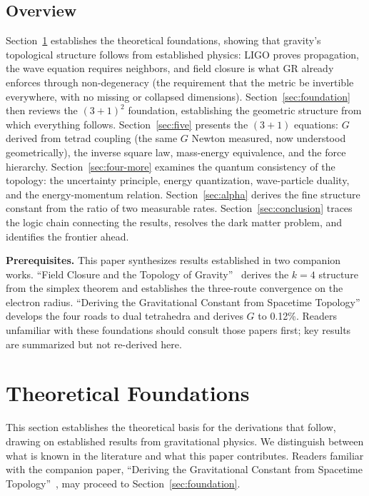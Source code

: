 \documentclass[aps,prd,preprint,superscriptaddress,showpacs,preprintnumbers,amsmath,amssymb,nofootinbib]{revtex4-2}
\begin{document}
\subsection{Overview}
\label{subsec:structure}

Section~\ref{sec:theory} establishes the theoretical foundations, showing that gravity's topological structure follows from established physics: LIGO proves propagation, the wave equation requires neighbors, and field closure is what GR already enforces through non-degeneracy (the requirement that the metric be invertible everywhere, with no missing or collapsed dimensions). Section~\ref{sec:foundation} then reviews the $(3+1)^2$ foundation, establishing the geometric structure from which everything follows. Section~\ref{sec:five} presents the $(3+1)$ equations: $G$ derived from tetrad coupling (the same $G$ Newton measured, now understood geometrically), the inverse square law, mass-energy equivalence, and the force hierarchy. Section~\ref{sec:four-more} examines the quantum consistency of the topology: the uncertainty principle, energy quantization, wave-particle duality, and the energy-momentum relation. Section~\ref{sec:alpha} derives the fine structure constant from the ratio of two measurable rates. Section~\ref{sec:conclusion} traces the logic chain connecting the results, resolves the dark matter problem, and identifies the frontier ahead.

\textbf{Prerequisites.} This paper synthesizes results established in two companion works. ``Field Closure and the Topology of Gravity''~\cite{paper5} derives the $k=4$ structure from the simplex theorem and establishes the three-route convergence on the electron radius. ``Deriving the Gravitational Constant from Spacetime Topology''~\cite{paper6} develops the four roads to dual tetrahedra and derives $G$ to 0.12\%. Readers unfamiliar with these foundations should consult those papers first; key results are summarized but not re-derived here.

\section{Theoretical Foundations}
\label{sec:theory}

This section establishes the theoretical basis for the derivations that follow, drawing on established results from gravitational physics. We distinguish between what is known in the literature and what this paper contributes. Readers familiar with the companion paper, ``Deriving the Gravitational Constant from Spacetime Topology''~\cite{paper6}, may proceed to Section~\ref{sec:foundation}.
\end{document}

